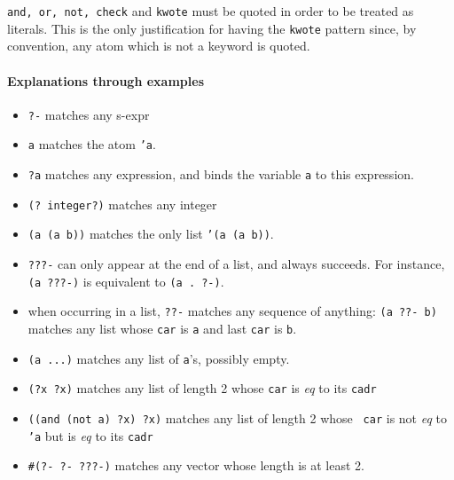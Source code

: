 \begin{note}
  {\tt and, or, not, check} and {\tt kwote} must be quoted in order to
  be treated as literals. This is the only justification for having
  the {\tt kwote} pattern since, by convention, any atom which is not
  a keyword is quoted.
\end{note}

\paragraph{Explanations through examples}

\begin{itemize}


\item {\tt ?-} matches any s-expr

\item {\tt a} matches the atom {\tt 'a}.

\item {\tt ?a} matches any expression, and binds the variable {\tt a} to
this expression.

\item {\tt (? integer?)} matches any integer

\item {\tt (a (a b))} matches the only list {\tt '(a (a b))}.

\item {\tt ???-} can only appear at the end of a list, and always succeeds.
For instance, {\tt (a ???-)} is equivalent to {\tt (a . ?-)}.

\item when occurring in a list, {\tt ??-} matches any sequence of anything:
{\tt (a ??- b)} matches any list whose {\tt car} is {\tt a} and last
{\tt car} is {\tt b}. 

\item \verb#(a ...)# matches any list of {\tt a}'s, possibly empty.

\item {\tt (?x ?x)} matches any list of length 2 whose {\tt car} is {\em eq} to its {\tt cadr}

\item {\tt ((and (not a) ?x) ?x)} matches any list of length 2 whose {\tt
car} is not {\em eq} to {\tt 'a} but is {\em eq} to its {\tt cadr}

\item {\tt \#(?- ?- ???-)} matches any vector whose length is at least 2.
\end{itemize}

